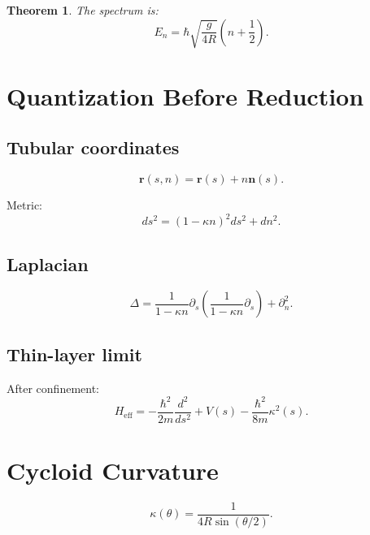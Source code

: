 \documentclass[11pt]{article}
\newtheorem{theorem}{Theorem}
\begin{document}
\begin{theorem}
The spectrum is:
\begin{equation}
E_n = \hbar\sqrt{\frac{g}{4R}}\left(n+\frac{1}{2}\right).
\end{equation}
\end{theorem}

\section{Quantization Before Reduction}

\subsection{Tubular coordinates}

\begin{equation}
\mathbf{r}(s,n) = \mathbf{r}(s) + n \mathbf{n}(s).
\end{equation}

Metric:
\begin{equation}
ds^2 = (1-\kappa n)^2 ds^2 + dn^2.
\end{equation}

\subsection{Laplacian}

\begin{equation}
\Delta =
\frac{1}{1-\kappa n}\partial_s
\left(\frac{1}{1-\kappa n}\partial_s\right)
+ \partial_n^2.
\end{equation}

\subsection{Thin-layer limit}

After confinement:
\begin{equation}
H_{\text{eff}} =
-\frac{\hbar^2}{2m}\frac{d^2}{ds^2}
+ V(s)
-\frac{\hbar^2}{8m}\kappa^2(s).
\end{equation}

\section{Cycloid Curvature}

\begin{equation}
\kappa(\theta) = \frac{1}{4R\sin(\theta/2)}.
\end{equation}
\end{document}
